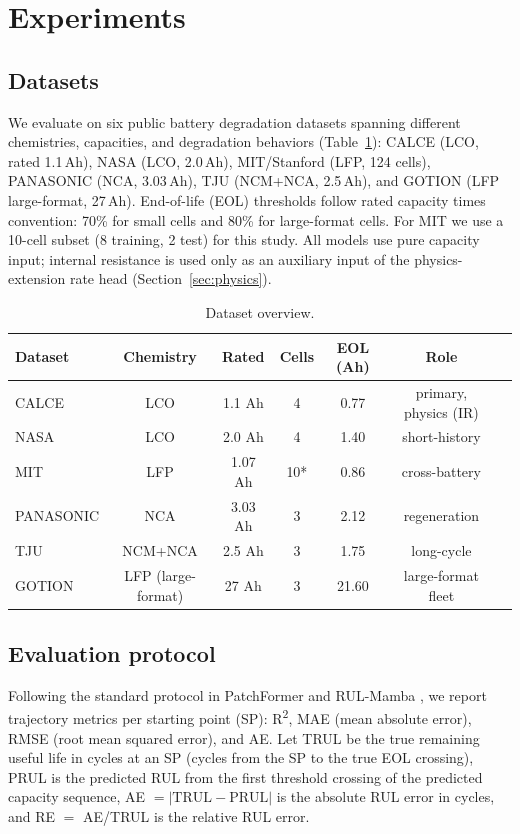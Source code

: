 \section{Experiments}
\label{sec:exp}

\subsection{Datasets}
\label{sec:datasets}

We evaluate on six public battery degradation datasets spanning
different chemistries, capacities, and degradation behaviors
(Table~\ref{tab:datasets}): CALCE (LCO, rated 1.1\,Ah), NASA
\cite{ref_nasa_data} (LCO, 2.0\,Ah), MIT/Stanford \cite{ref_severson}
(LFP, 124 cells), PANASONIC (NCA, 3.03\,Ah), TJU (NCM+NCA,
2.5\,Ah), and GOTION (LFP large-format, 27\,Ah). End-of-life (EOL) thresholds follow rated
capacity times convention: 70\% for small cells and 80\% for
large-format cells. For MIT we use a 10-cell subset (8 training, 2 test) for this study.
All models use pure capacity input; internal resistance is used only
as an auxiliary input of the physics-extension rate head
(Section~\ref{sec:physics}).

\begin{table}[htbp]
\centering
\caption{Dataset overview.}
\label{tab:datasets}
\tiny
\begin{tabular}{lcccccl}
\toprule
Dataset & Chemistry & Rated & Cells & EOL (Ah) & Role \\
\midrule
CALCE & LCO & 1.1 Ah & 4 & 0.77 & primary, physics (IR) \\
NASA & LCO & 2.0 Ah & 4 & 1.40 & short-history \\
MIT & LFP & 1.07 Ah & 10* & 0.86 & cross-battery \\
PANASONIC & NCA & 3.03 Ah & 3 & 2.12 & regeneration \\
TJU & NCM+NCA & 2.5 Ah & 3 & 1.75 & long-cycle \\
GOTION & LFP (large-format) & 27 Ah & 3 & 21.60 & large-format fleet \\
\bottomrule
\end{tabular}
\end{table}

\subsection{Evaluation protocol}
\label{sec:protocol}

Following the standard protocol in PatchFormer \cite{ref_patchformer}
and RUL-Mamba \cite{ref_rulmamba}, we report trajectory
metrics per starting point (SP): R\textsuperscript{2}, MAE (mean absolute error),
RMSE (root mean squared error), and AE. Let TRUL be the true
remaining useful life in cycles at an SP (cycles from the SP to the
true EOL crossing), PRUL is the predicted RUL from the first threshold
crossing of the predicted capacity sequence, AE $= |\text{TRUL} -
\text{PRUL}|$ is the absolute RUL error in cycles, and RE $=$
AE/TRUL is the relative RUL error.

